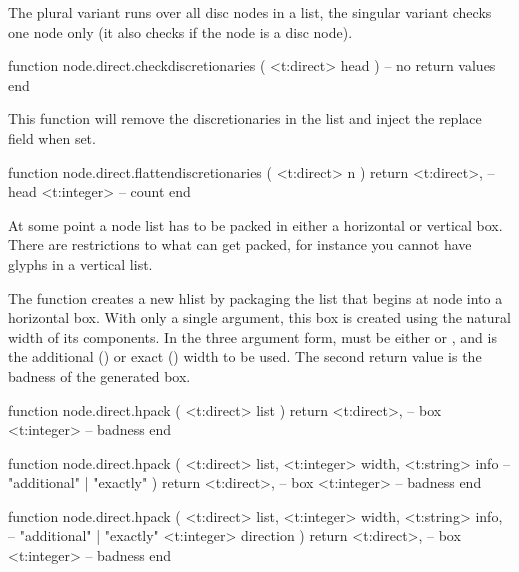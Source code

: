 The plural variant runs over all disc nodes in a list, the singular variant
checks one node only (it also checks if the node is a disc node).

\starttyping[option=LUA]
function node.direct.checkdiscretionaries ( <t:direct> head )
    -- no return values
end
\stoptyping

This function will remove the discretionaries in the list and inject the replace
field when set.

\starttyping[option=LUA]
function node.direct.flattendiscretionaries ( <t:direct> n )
    return
        <t:direct>, -- head
        <t:integer> -- count
end
\stoptyping

\stopsubsection

\startsubsection[title=Packaging and dimensions]

At some point a node list has to be packed in either a horizontal or vertical
box. There are restrictions to what can get packed, for instance you cannot have
glyphs in a vertical list.


The  function creates a new hlist by packaging the list that begins
at node  into a horizontal box. With only a single argument, this box is
created using the natural width of its components. In the three argument form,
 must be either  or , and 
is the additional () or exact () width to be
used. The second return value is the badness of the generated box.

\starttyping[option=LUA]
function node.direct.hpack (
    <t:direct> list
)
    return
        <t:direct>, -- box
        <t:integer> -- badness
end

function node.direct.hpack (
    <t:direct>  list,
    <t:integer> width,
    <t:string>  info -- "additional" | "exactly"
)
    return
        <t:direct>, -- box
        <t:integer> -- badness
end

function node.direct.hpack (
    <t:direct>  list,
    <t:integer> width,
    <t:string>  info, -- "additional" | "exactly"
    <t:integer> direction
)
    return
        <t:direct>, -- box
        <t:integer> -- badness
end
\stoptyping



